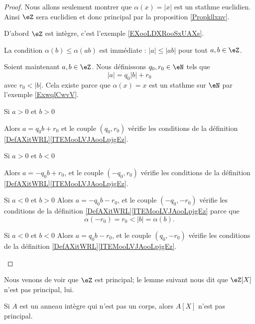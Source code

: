 \begin{proof}
    Nous allons seulement montrer que \( \alpha(x)=| x |\) est un stathme euclidien. Ainsi \( \eZ\) sera euclidien et donc principal par la proposition \ref{Propkllxnv}.

    D'abord \( \eZ\) est intègre, c'est l'exemple \ref{EXooLDXRooSxUAXs}.

    La condition \( \alpha(b)\leq \alpha(ab)\) est immédiate : \( | a |\leq | ab |\) pour tout \( a,b\in \eZ\).

    Soient maintenant \( a,b\in \eZ\). Nous définissons \( q_0,r_0\in \eN\) tels que
    \begin{equation}
        | a |=q_0| b |+r_0
    \end{equation}
    avec \( r_0<| b |\). Cela existe parce que \( \alpha(x)=x\) est un stathme sur \( \eN\) par l'exemple \ref{ExwqlCwvV}.

    \begin{subproof}
        \item[Si \( a>0\) et \( b>0\)]

            Alors \( a=q_0b+r_0\) et le couple \( (q_0,r_0)\) vérifie les conditions de la définition \ref{DefAXitWRL}\ref{ITEMooLVJAooLpjgEz}.

        \item[Si \( a>0\) et \( b<0\)]

            Alors \( a=-q_0b+r_0\), et le couple \( (-q_0,r_0)\) vérifie les conditions de la définition \ref{DefAXitWRL}\ref{ITEMooLVJAooLpjgEz}.


        \item[Si \( a<0\) et \( b>0\)]
            Alors \( a=-q_0b-r_0\), et le couple \( (-q_0,-r_0)\) vérifie les conditions de la définition \ref{DefAXitWRL}\ref{ITEMooLVJAooLpjgEz} parce que
            \begin{equation}
                \alpha(-r_0)=r_0<| b |=\alpha(b).
            \end{equation}
        \item[Si \( a<0\) et \( b<0\)]
            Alors \( a=q_0b-r_0\), et le couple \( (q_0,-r_0)\) vérifie les conditions de la définition \ref{DefAXitWRL}\ref{ITEMooLVJAooLpjgEz}.

    \end{subproof}
\end{proof}

Nous venons de voir que \( \eZ\) est principal; le lemme suivant nous dit que $\eZ[X]$ n'est pas principal, lui.
\begin{lemma}        \label{LEMooDJSUooJWyxCL}
    Si $A$ est un anneau intègre qui n'est pas un corps, alors \( A[X]\) n'est pas principal.
\end{lemma}

